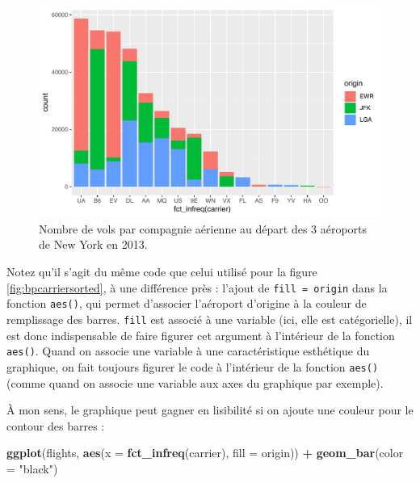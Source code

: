 \documentclass[a4paperpaper,]{article}
\newenvironment{Shaded}{\begin{snugshade}}{\end{snugshade}}
\newcommand{\KeywordTok}[1]{\textcolor[rgb]{0.13,0.29,0.53}{\textbf{#1}}}
\newcommand{\DataTypeTok}[1]{\textcolor[rgb]{0.13,0.29,0.53}{#1}}
\newcommand{\StringTok}[1]{\textcolor[rgb]{0.31,0.60,0.02}{#1}}
\newcommand{\OperatorTok}[1]{\textcolor[rgb]{0.81,0.36,0.00}{\textbf{#1}}}
\newcommand{\NormalTok}[1]{#1}
\theoremstyle{definition}
\theoremstyle{definition}
\theoremstyle{definition}
\theoremstyle{remark}
\begin{document}
\begin{figure}[htpb]

{\centering \includegraphics[width=0.9\linewidth]{figure/stacked-1} 

}

\caption{Nombre de vols par compagnie aérienne au départ des 3 aéroports de New York en 2013.}\label{fig:stacked}
\end{figure}

Notez qu'il s'agit du même code que celui utilisé pour la figure
\ref{fig:bpcarriersorted}, à une différence près : l'ajout de
\texttt{fill\ =\ origin} dans la fonction \texttt{aes()}, qui permet
d'associer l'aéroport d'origine à la couleur de remplissage des barres.
\texttt{fill} est associé à une variable (ici, elle est catégorielle),
il est donc indispensable de faire figurer cet argument à l'intérieur de
la fonction \texttt{aes()}. Quand on associe une variable à une
caractéristique esthétique du graphique, on fait toujours figurer le
code à l'intérieur de la fonction \texttt{aes()} (comme quand on associe
une variable aux axes du graphique par exemple).

À mon sens, le graphique peut gagner en lisibilité si on ajoute une
couleur pour le contour des barres :

\begin{Shaded}
\begin{Highlighting}[]
\KeywordTok{ggplot}\NormalTok{(flights, }\KeywordTok{aes}\NormalTok{(}\DataTypeTok{x =} \KeywordTok{fct_infreq}\NormalTok{(carrier), }\DataTypeTok{fill =}\NormalTok{ origin)) }\OperatorTok{+}
\StringTok{  }\KeywordTok{geom_bar}\NormalTok{(}\DataTypeTok{color =} \StringTok{"black"}\NormalTok{)}
\end{Highlighting}
\end{Shaded}
\end{document}
